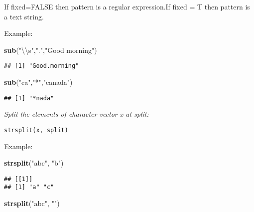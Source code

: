 \documentclass[]{book}
\newenvironment{Shaded}{\begin{snugshade}}{\end{snugshade}}
\newcommand{\KeywordTok}[1]{\textcolor[rgb]{0.13,0.29,0.53}{\textbf{#1}}}
\newcommand{\CharTok}[1]{\textcolor[rgb]{0.31,0.60,0.02}{#1}}
\newcommand{\StringTok}[1]{\textcolor[rgb]{0.31,0.60,0.02}{#1}}
\newcommand{\NormalTok}[1]{#1}
\theoremstyle{definition}
\theoremstyle{definition}
\theoremstyle{definition}
\theoremstyle{remark}
\begin{document}
If fixed=FALSE then pattern is a regular expression.If fixed = T then
pattern is a text string.

Example:

\begin{Shaded}
\begin{Highlighting}[]
\KeywordTok{sub}\NormalTok{(}\StringTok{"}\CharTok{\textbackslash{}\textbackslash{}}\StringTok{s"}\NormalTok{,}\StringTok{"."}\NormalTok{,}\StringTok{"Good morning"}\NormalTok{) }
\end{Highlighting}
\end{Shaded}

\begin{verbatim}
## [1] "Good.morning"
\end{verbatim}

\begin{Shaded}
\begin{Highlighting}[]
\KeywordTok{sub}\NormalTok{(}\StringTok{"ca"}\NormalTok{,}\StringTok{"*"}\NormalTok{,}\StringTok{"canada"}\NormalTok{)}
\end{Highlighting}
\end{Shaded}

\begin{verbatim}
## [1] "*nada"
\end{verbatim}

\emph{Split the elements of character vector x at split: }

\begin{verbatim}
strsplit(x, split)  
\end{verbatim}

Example:

\begin{Shaded}
\begin{Highlighting}[]
\KeywordTok{strsplit}\NormalTok{(}\StringTok{"abc"}\NormalTok{, }\StringTok{"b"}\NormalTok{) }
\end{Highlighting}
\end{Shaded}

\begin{verbatim}
## [[1]]
## [1] "a" "c"
\end{verbatim}

\begin{Shaded}
\begin{Highlighting}[]
\KeywordTok{strsplit}\NormalTok{(}\StringTok{"abc"}\NormalTok{, }\StringTok{""}\NormalTok{) }
\end{Highlighting}
\end{Shaded}
\end{document}
